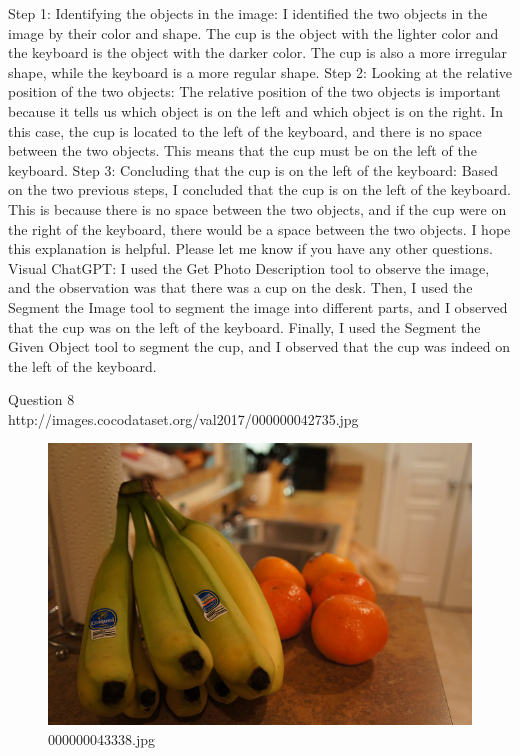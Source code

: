 \begin{enumerate}
        Step 1: Identifying the objects in the image: I identified the two objects in the image by their color and shape. The cup is the object with the lighter color and the keyboard is the object with the darker color. The cup is also a more irregular shape, while the keyboard is a more regular shape.
        Step 2: Looking at the relative position of the two objects: The relative position of the two objects is important because it tells us which object is on the left and which object is on the right. In this case, the cup is located to the left of the keyboard, and there is no space between the two objects. This means that the cup must be on the left of the keyboard.
        Step 3: Concluding that the cup is on the left of the keyboard: Based on the two previous steps, I concluded that the cup is on the left of the keyboard. This is because there is no space between the two objects, and if the cup were on the right of the keyboard, there would be a space between the two objects.
        I hope this explanation is helpful. Please let me know if you have any other questions.
        \subitem Visual ChatGPT: I used the Get Photo Description tool to observe the image, and the observation was that there was a cup on the desk. Then, I used the Segment the Image tool to segment the image into different parts, and I observed that the cup was on the left of the keyboard. Finally, I used the Segment the Given Object tool to segment the cup, and I observed that the cup was indeed on the left of the keyboard.
    \end{enumerate}
Question 8\\
http://images.cocodataset.org/val2017/000000042735.jpg
    \begin{figure}[h]
        \centering
        \includegraphics[width=0.8\linewidth]{../image set/easy/000000043338.jpg}
        \caption{000000043338.jpg}
    \end{figure}
